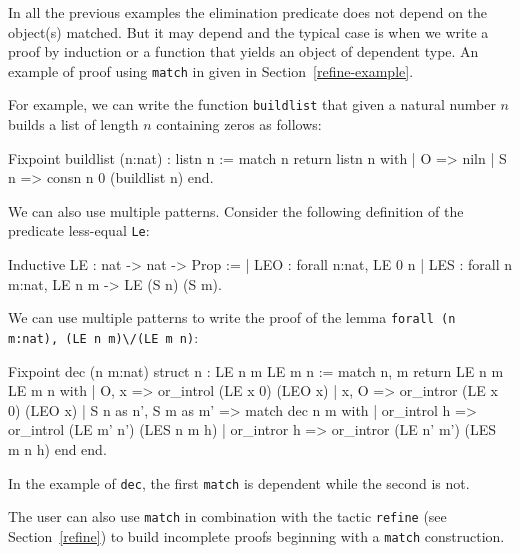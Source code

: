 In all the previous examples the elimination predicate does not depend
on the object(s) matched. But it may depend and the typical case 
is when we write a proof by induction or a function that yields an
object of dependent type. An example of proof using \texttt{match} in
given in Section~\ref{refine-example}.

For example, we can write 
the function \texttt{buildlist} that given a natural number
$n$ builds a list of length $n$ containing zeros as follows:

\begin{coq_example}
Fixpoint buildlist (n:nat) : listn n :=
  match n return listn n with
  | O => niln
  | S n => consn n 0 (buildlist n)
  end.
\end{coq_example}

We can also use multiple patterns. 
Consider the following definition of the predicate less-equal
\texttt{Le}:

\begin{coq_example}
Inductive LE : nat -> nat -> Prop :=
  | LEO : forall n:nat, LE 0 n
  | LES : forall n m:nat, LE n m -> LE (S n) (S m).
\end{coq_example}

We can use multiple patterns to write  the proof of the lemma
 \texttt{forall (n m:nat), (LE n m)}\verb=\/=\texttt{(LE m n)}:

\begin{coq_example}
Fixpoint dec (n m:nat) {struct n} : LE n m \/ LE m n :=
  match n, m return LE n m \/ LE m n with
  | O, x => or_introl (LE x 0) (LEO x)
  | x, O => or_intror (LE x 0) (LEO x)
  | S n as n', S m as m' =>
      match dec n m with
      | or_introl h => or_introl (LE m' n') (LES n m h)
      | or_intror h => or_intror (LE n' m') (LES m n h)
      end
  end.
\end{coq_example}
In the example of \texttt{dec},
the first \texttt{match} is dependent while 
the second is not.


The user can also use \texttt{match} in combination with the tactic
\texttt{refine} (see Section~\ref{refine}) to build incomplete proofs
beginning with a \texttt{match} construction.

